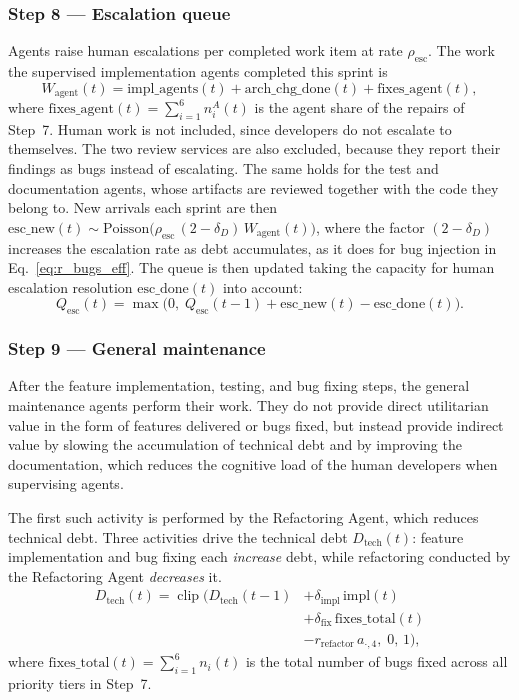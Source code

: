 \documentclass[smallextended]{svjour3}       %
\begin{document}
\subsubsection*{Step 8 --- Escalation queue}
Agents raise human escalations per completed work item at rate $\rho_\mathrm{esc}$.
The work the supervised implementation agents completed this sprint is
\begin{equation}
  W_\mathrm{agent}(t) = \mathrm{impl\_agents}(t) + \mathrm{arch\_chg\_done}(t)
    + \mathrm{fixes\_agent}(t),
  \label{eq:w_agent}
\end{equation}
where $\mathrm{fixes\_agent}(t) = \sum_{i=1}^{6} n^A_i(t)$ is the agent share of the
repairs of Step~7. Human work is not included, since developers do not escalate to
themselves. The two review services are also excluded, because they report their findings as bugs instead of
escalating. The same holds for the test and documentation agents, whose artifacts are reviewed
together with the code they belong to. New arrivals each sprint are then
$\mathrm{esc\_new}(t) \sim \mathrm{Poisson}\bigl(\rho_\mathrm{esc}\,(2-\delta_D)\,W_\mathrm{agent}(t)\bigr)$,
where the factor $(2 - \delta_D)$ increases the escalation rate as debt accumulates, as
it does for bug injection in Eq.~\eqref{eq:r_bugs_eff}. The queue is then updated taking
the capacity for human escalation resolution $\mathrm{esc\_done}(t)$ into account:
\begin{equation}
  Q_\mathrm{esc}(t) = \max\!\bigl(0,\;
    Q_\mathrm{esc}(t-1) + \mathrm{esc\_new}(t) - \mathrm{esc\_done}(t)\bigr).
  \label{eq:qesc}
\end{equation}

\subsubsection*{Step 9 --- General maintenance}
After the feature implementation, testing, and bug fixing steps, the general maintenance
agents perform their work. They do not provide direct utilitarian value in the form of features delivered or bugs fixed, but instead provide indirect value by slowing the accumulation of technical debt and by improving the documentation, which reduces the cognitive load of the human developers when supervising agents.

The first such activity is performed by the Refactoring Agent, which reduces technical debt. 
Three activities drive the technical debt $D_\mathrm{tech}(t)$: feature implementation and
bug fixing each \emph{increase} debt, while refactoring conducted by the Refactoring Agent 
\emph{decreases} it.
\begin{equation}
\begin{split}
  D_\mathrm{tech}(t) = \operatorname{clip}\bigl(D_\mathrm{tech}(t-1)
    &+ \delta_\mathrm{impl}\,\mathrm{impl}(t) \\
    &+ \delta_\mathrm{fix}\,\mathrm{fixes\_total}(t) \\
    &- r_\mathrm{refactor}\,a_{\cdot,4},\; 0,\, 1\bigr),
  \label{eq:debt_update}
\end{split}
\end{equation}
where $\mathrm{fixes\_total}(t) = \sum_{i=1}^{6} n_i(t)$ is the total number of bugs fixed across all priority tiers in Step~7.
\end{document}

